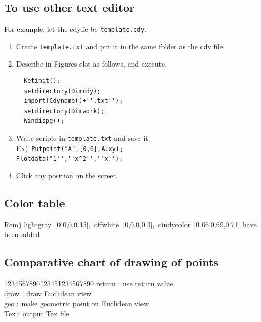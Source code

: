 \documentclass[papersize,a4paper,12pt]{article}
\begin{document}
\subsection{To use other text editor}


For example, let the cdyfie be \verb|template.cdy|.

\begin{enumerate}[(1)]
\item Create \verb|template.txt| and put it in the same folder as the cdy file.
\item Describe in Figures slot as follows, and execute.
\begin{verbatim}
  Ketinit();
  setdirectory(Dircdy);
  import(Cdyname()+''.txt'');
  setdirectory(Dirwork);
  Windispg();
\end{verbatim}

\item Write scripts in \verb|template.txt| and save it.\\
Ex)\ \verb|Putpoint("A",[0,0],A.xy);|\\
\phantom{Ex)\ }\verb|Plotdata("1'',''x^2'',''x'');|

\item Click any position on the screen.

\end{enumerate}

\subsection{Color table}

\begin{center}

\end{center}

Rem) lightgray\ [0,0,0,0.15],\ offwhite\ [0,0,0,0.3],\ cindycolor\ [0.66,0,69,0.71] have been added.

\newpage

\hypertarget{mkpttable}{}
\subsection{Comparative chart of drawing of points}
\begin{tabbing}
123456789012345\=1234567890\=\kill
 \> return \>: use return value\\
 \> draw \>: draw Euclidean view\\
 \> geo \>: make geometric point on Euclidean view\\
 \> Tex \>: output Tex file
\end{tabbing}
\end{document}
